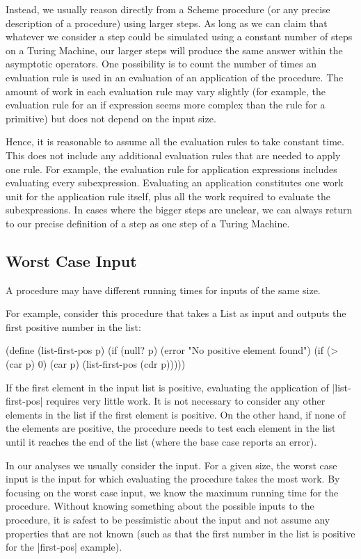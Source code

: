 \begin{schemeregion}
Instead, we usually reason directly from a Scheme procedure (or any precise description of a procedure) using larger steps.  As long as we can claim that whatever we consider a step could be simulated using a constant number of steps on a Turing Machine, our larger steps will produce the same answer within the asymptotic operators.  One possibility is to count the number of times an evaluation rule is used in an evaluation of an application of the procedure.  The amount of work in each evaluation rule may vary slightly (for example, the evaluation rule for an if expression seems more complex than the rule for a primitive) but does not depend on the input size.  

Hence, it is reasonable to assume all the evaluation rules to take constant time.  This does not include any additional evaluation rules that are needed to apply one rule.  For example, the evaluation rule for application expressions includes evaluating every subexpression.  Evaluating an application constitutes one work unit for the application rule itself, plus all the work required to evaluate the subexpressions.  In cases where the bigger steps are unclear, we can always return to our precise definition of a step as one step of a Turing Machine.  

\subsection{Worst Case Input}\label{sec:worstcase}

A procedure may have different running times for inputs of the same size.  

For example, consider this procedure that takes a List as input and outputs the first positive number in the list:
\begin{schemedisplay}
(define (list-first-pos p)
  (if (null? p) (error "No positive element found")
      (if (> (car p) 0) (car p) (list-first-pos (cdr p)))))
\end{schemedisplay}

If the first element in the input list is positive, evaluating the application of \scheme|list-first-pos| requires very little work.  It is not necessary to consider any other elements in the list if the first element is positive.  On the other hand, if none of the elements are positive, the procedure needs to test each element in the list until it reaches the end of the list (where the base case reports an error).  

In our analyses we usually consider the  input.  For a given size, the worst case input is the input for which evaluating the procedure takes the most work.  By focusing on the worst case input, we know the maximum running time for the procedure.  Without knowing something about the possible inputs to the procedure, it is safest to be pessimistic about the input and not assume any properties that are not known (such as that the first number in the list is positive for the \scheme|first-pos| example).


\end{schemeregion}
